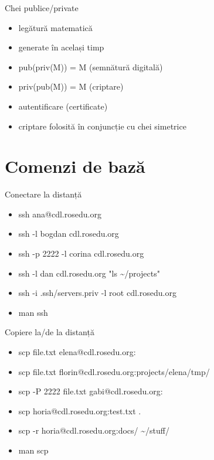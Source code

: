 \documentclass{beamer}
\begin{document}
\begin{frame}{Chei publice/private}
  \begin{itemize}
    \item legătură matematică
    \item generate în același timp
    \item pub(priv(M)) = M (semnătură digitală)
    \item priv(pub(M)) = M (criptare)
    \item autentificare (certificate)
    \item criptare folosită în conjuncție cu chei simetrice
  \end{itemize}
\end{frame}

\section{Comenzi de bază}
\frame{\tableofcontents[currentsection]}

\begin{frame}{Conectare la distanță}
  \begin{itemize}
    \item ssh ana@cdl.rosedu.org
    \item ssh -l bogdan cdl.rosedu.org
    \item ssh -p 2222 -l corina cdl.rosedu.org
    \item ssh -l dan cdl.rosedu.org "ls \~{}/projects"
    \item ssh -i .ssh/servers.priv -l root cdl.rosedu.org
    \item man ssh
  \end{itemize}
\end{frame}

\begin{frame}{Copiere la/de la distanță}
  \begin{itemize}
    \item scp file.txt elena@cdl.rosedu.org:
    \item scp file.txt florin@cdl.rosedu.org:projects/elena/tmp/
    \item scp -P 2222 file.txt gabi@cdl.rosedu.org:
    \item scp horia@cdl.rosedu.org:test.txt .
    \item scp -r horia@cdl.rosedu.org:docs/ \~{}/stuff/
    \item man scp
  \end{itemize}
\end{frame}
\end{document}
